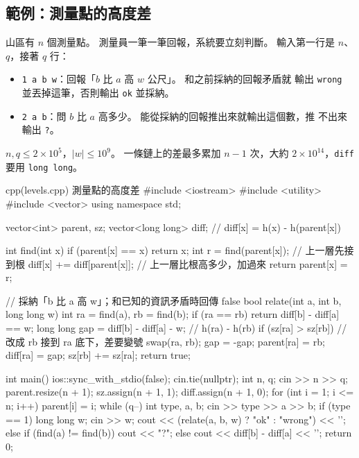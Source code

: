 \subsection{範例：測量點的高度差}

山區有 $n$ 個測量點。 測量員一筆一筆回報，系統要立刻判斷。 輸入第一行是 $n$、
$q$，接著 $q$ 行：

\begin{itemize}
\item \texttt{1 a b w}：回報「$b$ 比 $a$ 高 $w$ 公尺」。 和之前採納的回報矛盾就
輸出 \texttt{wrong} 並丟掉這筆，否則輸出 \texttt{ok} 並採納。
\item \texttt{2 a b}：問 $b$ 比 $a$ 高多少。 能從採納的回報推出來就輸出這個數，推
不出來輸出 \texttt{?}。
\end{itemize}

$n, q \le 2 \times 10^5$，$|w| \le 10^9$。 一條鏈上的差最多累加 $n - 1$ 次，大約
$2 \times 10^{14}$，\texttt{diff} 要用 \texttt{long long}。

\begin{example}[label=ex:levels]{cpp}{(levels.cpp) 測量點的高度差}
#include <iostream>
#include <utility>
#include <vector>
using namespace std;

vector<int> parent, sz;
vector<long long> diff;            // diff[x] = h(x) - h(parent[x])

int find(int x) {
    if (parent[x] == x) {
        return x;
    }
    int r = find(parent[x]);       // 上一層先接到根
    diff[x] += diff[parent[x]];    // 上一層比根高多少，加過來
    return parent[x] = r;
}

// 採納「b 比 a 高 w」；和已知的資訊矛盾時回傳 false
bool relate(int a, int b, long long w) {
    int ra = find(a), rb = find(b);
    if (ra == rb) {
        return diff[b] - diff[a] == w;
    }
    long long gap = diff[b] - diff[a] - w;  // h(ra) - h(rb)
    if (sz[ra] > sz[rb]) {         // 改成 rb 接到 ra 底下，差要變號
        swap(ra, rb);
        gap = -gap;
    }
    parent[ra] = rb;
    diff[ra] = gap;
    sz[rb] += sz[ra];
    return true;
}

int main() {
    ios::sync_with_stdio(false);
    cin.tie(nullptr);
    int n, q;
    cin >> n >> q;
    parent.resize(n + 1);
    sz.assign(n + 1, 1);
    diff.assign(n + 1, 0);
    for (int i = 1; i <= n; i++) {
        parent[i] = i;
    }
    while (q--) {
        int type, a, b;
        cin >> type >> a >> b;
        if (type == 1) {
            long long w;
            cin >> w;
            cout << (relate(a, b, w) ? "ok" : "wrong") << '\n';
        } else if (find(a) != find(b)) {
            cout << "?\n";
        } else {
            cout << diff[b] - diff[a] << '\n';
        }
    }
    return 0;
}
\end{example}

